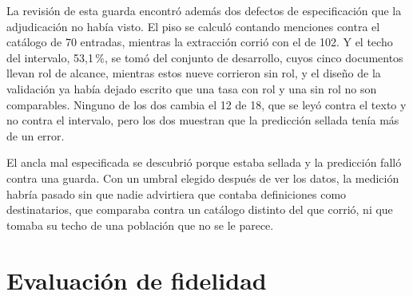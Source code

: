 \documentclass[12pt,a4paper]{report}
\begin{document}
La revisión de esta guarda encontró además dos defectos de especificación que la adjudicación no había visto. El piso se calculó contando menciones contra el catálogo de 70 entradas, mientras la extracción corrió con el de 102. Y el techo del intervalo, 53,1\,\%, se tomó del conjunto de desarrollo, cuyos cinco documentos llevan rol de alcance, mientras estos nueve corrieron sin rol, y el diseño de la validación ya había dejado escrito que una tasa con rol y una sin rol no son comparables. Ninguno de los dos cambia el 12 de 18, que se leyó contra el texto y no contra el intervalo, pero los dos muestran que la predicción sellada tenía más de un error.

El ancla mal especificada se descubrió porque estaba sellada y la predicción falló contra una guarda. Con un umbral elegido después de ver los datos, la medición habría pasado sin que nadie advirtiera que contaba definiciones como destinatarios, que comparaba contra un catálogo distinto del que corrió, ni que tomaba su techo de una población que no se le parece.

\chapter{Evaluación de fidelidad}
\label{cap:fidelidad}
\end{document}
